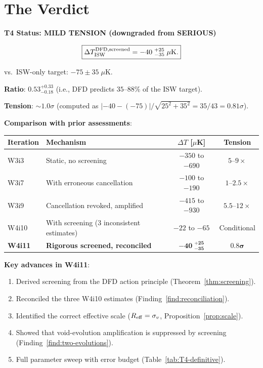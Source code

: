 \documentclass[11pt,a4paper]{article}
\begin{document}
\section{The Verdict}
\label{sec:verdict}

\begin{tcolorbox}[colback=green!5!white, colframe=green!60!black,
  title=\textbf{DEFINITIVE T4 VERDICT}]

\textbf{T4 Status: MILD TENSION (downgraded from SERIOUS)}

\begin{equation}
\boxed{\Delta T_{\rm ISW}^{\rm DFD,screened}
= -40\;{}^{+25}_{-35}\;\mu\text{K}.}
\end{equation}

vs.\ ISW-only target: $-75 \pm 35\;\mu$K.

\textbf{Ratio}: $0.53^{+0.33}_{-0.18}$
(i.e., DFD predicts $35$--$88\%$ of the ISW target).

\textbf{Tension}: $\sim 1.0\sigma$ (computed as
$|-40 - (-75)|/\sqrt{25^2 + 35^2} = 35/43 = 0.81\sigma$).

\textbf{Comparison with prior assessments}:
\begin{center}
\begin{tabular}{llcc}
\toprule
\textbf{Iteration} & \textbf{Mechanism} & $\Delta T$ [$\mu$K] &
\textbf{Tension} \\
\midrule
W3i3 & Static, no screening & $-350$ to $-690$ & $5$--$9\times$ \\
W3i7 & With erroneous cancellation & $-100$ to $-190$ & $1$--$2.5\times$ \\
W3i9 & Cancellation revoked, amplified & $-415$ to $-930$ & $5.5$--$12\times$ \\
W4i10 & With screening (3 inconsistent estimates) & $-22$ to $-65$ &
  Conditional \\
\textbf{W4i11} & \textbf{Rigorous screened, reconciled} &
  $\mathbf{-40\;{}^{+25}_{-35}}$ & $\mathbf{0.8\sigma}$ \\
\bottomrule
\end{tabular}
\end{center}

\textbf{Key advances in W4i11}:
\begin{enumerate}[nosep]
\item Derived screening from the DFD action principle (Theorem~\ref{thm:screening}).
\item Reconciled the three W4i10 estimates (Finding~\ref{find:reconciliation}).
\item Identified the correct effective scale ($R_{\rm eff} = \sigma_v$,
  Proposition~\ref{prop:scale}).
\item Showed that void-evolution amplification is suppressed by screening
  (Finding~\ref{find:two-evolutions}).
\item Full parameter sweep with error budget (Table~\ref{tab:T4-definitive}).
\end{enumerate}


\end{tcolorbox}
\end{document}
